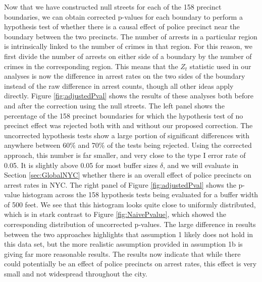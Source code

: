 \documentclass[a4paper,11pt]{article}
\begin{document}
Now that we have constructed null streets for each of the 158 precinct boundaries, we can obtain corrected p-values for each boundary to perform a hypothesis test of whether there is a causal effect of police precinct near the boundary between the two precincts. The number of arrests in a particular region is intrinsically linked to the number of crimes in that region. For this reason, we first divide the number of arrests on either side of a boundary by the number of crimes in the corresponding region. This means that the $Z_t$ statistic used in our analyses is now the difference in arrest rates on the two sides of the boundary instead of the raw difference in arrest counts, though all other ideas apply directly. Figure \ref{fig:adjustedPval} shows the results of these analyses both before and after the correction using the null streets. The left panel shows the percentage of the 158 precinct boundaries for which the hypothesis test of no precinct effect was rejected both with and without our proposed correction. The uncorrected hypothesis tests show a large portion of significant differences with anywhere between 60\% and 70\% of the tests being rejected. Using the corrected approach, this number is far smaller, and very close to the type I error rate of 0.05. It is slightly above 0.05 for most buffer sizes $\delta$, and we will evaluate in Section \ref{sec:GlobalNYC} whether there is an overall effect of police precincts on arrest rates in NYC. The right panel of Figure \ref{fig:adjustedPval} shows the p-value histogram across the 158 hypothesis tests being evaluated for a buffer width of 500 feet. We see that this histogram looks quite close to uniformly distributed, which is in stark contrast to Figure \ref{fig:NaivePvalue}, which showed the corresponding distribution of uncorrected p-values. The large difference in results between the two approaches highlights that assumption 1 likely does not hold in this data set, but the more realistic assumption provided in assumption 1b is giving far more reasonable results. The results now indicate that while there could potentially be an effect of police precincts on arrest rates, this effect is very small and not widespread throughout the city. 
\end{document}
